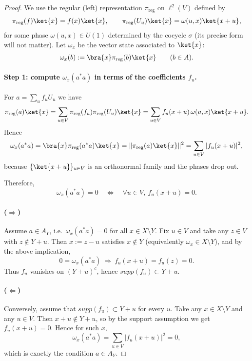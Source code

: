 \documentclass[12pt]{article}
\theoremstyle{definition} %
\theoremstyle{plain} %
\theoremstyle{remark} %
\theoremstyle{underline}
\begin{document}
\begin{proof}
We use the regular (left) representation $\pi_{\mathrm{reg}}$ on $\ell^2(V)$ defined by
\[
\pi_{\mathrm{reg}}(f)\ket{x}=f(x)\ket{x},\qquad 
\pi_{\mathrm{reg}}(U_u)\ket{x}=\omega(u,x)\ket{x+u},
\]
for some phase $\omega(u,x)\in U(1)$ determined by the cocycle $\sigma$ (its precise form will not matter).
Let $\omega_x$ be the vector state associated to $\ket{x}$:
\[
\omega_x(b):=\bra{x}\pi_{\mathrm{reg}}(b)\ket{x}\qquad (b\in A).
\]

\paragraph{Step 1: compute $\omega_x(a^*a)$ in terms of the coefficients $f_u$.}
For $a=\sum_u f_uU_u$ we have
\[
\pi_{\mathrm{reg}}(a)\ket{x}
=\sum_{u\in V} \pi_{\mathrm{reg}}(f_u)\pi_{\mathrm{reg}}(U_u)\ket{x}
=\sum_{u\in V} f_u(x+u)\,\omega(u,x)\ket{x+u}.
\]
Hence
\[
\omega_x(a^*a)
=\bra{x}\pi_{\mathrm{reg}}(a^*a)\ket{x}
=\|\pi_{\mathrm{reg}}(a)\ket{x}\|^2
=\sum_{u\in V}|f_u(x+u)|^2,
\]
because $\{\ket{x+u}\}_{u\in V}$ is an orthonormal family and the phases drop out.

Therefore,
\[
\omega_x(a^*a)=0
\quad\Longleftrightarrow\quad
\forall u\in V,\ f_u(x+u)=0.
\]

\paragraph{($\Rightarrow$)}
Assume $a\in A_Y$, i.e.\ $\omega_x(a^*a)=0$ for all $x\in X\setminus Y$.
Fix $u\in V$ and take any $z\in V$ with $z\notin Y+u$.
Then $x:=z-u$ satisfies $x\notin Y$ (equivalently $\omega_x\in X\setminus Y$), and by the above implication,
\[
0=\omega_x(a^*a)\ \Longrightarrow\ f_u(x+u)=f_u(z)=0.
\]
Thus $f_u$ vanishes on $(Y+u)^c$, hence $supp(f_u)\subset Y+u$.

\paragraph{($\Leftarrow$)}
Conversely, assume that $supp(f_u)\subset Y+u$ for every $u$.
Take any $x\in X\setminus Y$ and any $u\in V$.
Then $x+u\notin Y+u$, so by the support assumption we get $f_u(x+u)=0$.
Hence for such $x$,
\[
\omega_x(a^*a)=\sum_{u\in V}|f_u(x+u)|^2=0,
\]
which is exactly the condition $a\in A_Y$.
\end{proof}
\end{document}
